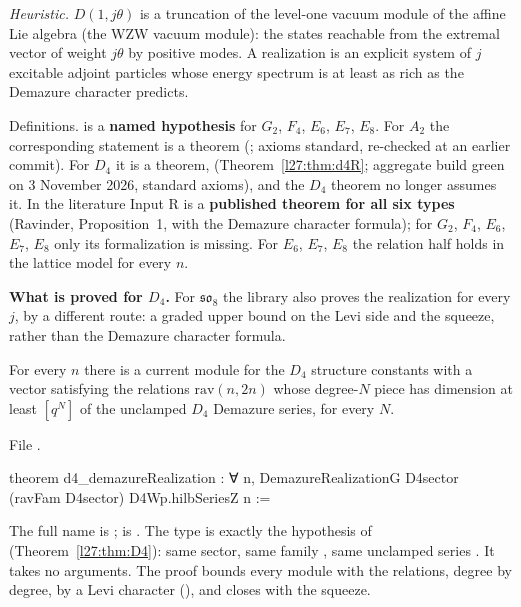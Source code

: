\begin{physics}
\emph{Heuristic.} $D(1,j\theta)$ is a truncation of the level-one vacuum module of the affine Lie algebra (the WZW vacuum
module): the states reachable from the extremal vector of weight $j\theta$ by positive modes. A realization is an explicit
system of $j$ excitable adjoint particles whose energy spectrum is at least as rich as the Demazure character predicts.
\end{physics}

\begin{status}
Definitions.  is a \textbf{named hypothesis} for $G_2$, $F_4$, $E_6$,
$E_7$, $E_8$. For $A_2$ the corresponding statement  is a theorem
(; axioms standard, re-checked at an earlier commit). For $D_4$ it is a theorem,
 (Theorem~\ref{l27:thm:d4R}; aggregate build green on 3 November 2026, standard axioms), and
the $D_4$ theorem  no longer assumes it. In the literature Input R is a
\textbf{published theorem for all six types} (Ravinder, Proposition~1, with the Demazure character formula); for $G_2$, $F_4$,
$E_6$, $E_7$, $E_8$ only its formalization is missing. For $E_6$, $E_7$, $E_8$ the relation half holds in the lattice model for
every $n$.
\end{status}

\textbf{What is proved for $D_4$.} For $\mathfrak{so}_8$ the library also proves the realization for every $j$, by a different
route: a graded upper bound on the Levi side and the squeeze, rather than the Demazure character formula.

\begin{theorem}\label{l27:thm:d4R}
For every $n$ there is a current module for the $D_4$ structure constants with a vector satisfying the relations
$\mathrm{rav}(n,2n)$ whose degree-$N$ piece has dimension at least $[q^N]$ of the unclamped $D_4$ Demazure series, for every $N$.
\end{theorem}
\noindent File .
\begin{leancode}
theorem d4_demazureRealization :
    ∀ n, DemazureRealizationG D4sector (ravFam D4sector) D4Wp.hilbSeriesZ n :=
\end{leancode}

\begin{dictionary}
The full name is ;  is . The type
is exactly the hypothesis  of  (Theorem~\ref{l27:thm:D4}): same sector, same family
, same unclamped series . It takes no arguments. The proof bounds every module with the
relations, degree by degree, by a Levi character (), and closes with the squeeze.
\end{dictionary}

